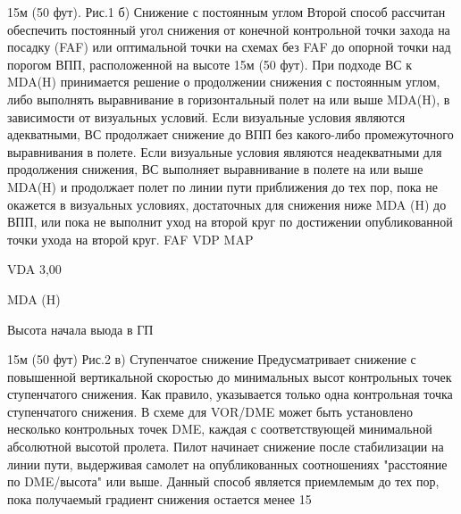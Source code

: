                                                                                                                          15м (50 фут).
                         Рис.1
б)	Снижение с постоянным углом
Второй способ рассчитан обеспечить постоянный угол снижения от конечной контрольной точки захода на посадку (FAF) или оптимальной точки на схемах без FAF до опорной точки над порогом ВПП, расположенной на высоте 15м (50 фут). При подходе ВС к MDA(H) принимается решение о продолжении снижения с постоянным углом, либо выполнять выравнивание в горизонтальный полет на или выше MDA(H), в зависимости от визуальных условий.
Если визуальные условия являются адекватными, ВС продолжает снижение до ВПП без какого-либо промежуточного выравнивания в полете.
Если визуальные условия являются неадекватными для продолжения снижения, ВС выполняет выравнивание в полете на или выше MDA(H) и продолжает полет по линии пути приближения до тех пор, пока не окажется в визуальных условиях, достаточных для снижения ниже MDA (H) до ВПП, или пока не выполнит уход на второй круг по достижении опубликованной точки ухода на второй круг.
   FAF                                                                VDP	                             MAP

	


                                            VDA 3,00




MDA (H)            
                
                Высота начала выода в ГП


                                                                                                    15м (50 фут)
                                           Рис.2
в)	Ступенчатое снижение
Предусматривает снижение с повышенной вертикальной скоростью до минимальных высот контрольных точек ступенчатого снижения. Как правило, указывается только одна контрольная точка ступенчатого снижения.
В	схеме для VOR/DME может быть установлено несколько контрольных точек DME, каждая с соответствующей минимальной абсолютной высотой пролета.
Пилот начинает снижение после стабилизации на линии пути, выдерживая самолет на опубликованных соотношениях "расстояние по DME/высота" или выше.
Данный способ является приемлемым до тех пор, пока получаемый градиент снижения остается менее 15%

